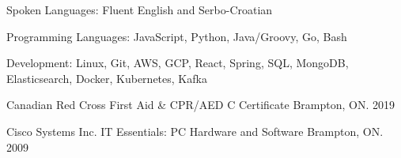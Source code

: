 
\begin{cvhonors}

  \cvhonor
    {Spoken Languages:} %
    {Fluent English and Serbo-Croatian} %
    {} %
    {} %

  \cvhonor
    {Programming Languages:} %
    {JavaScript, Python, Java/Groovy, Go, Bash} %
    {} %
    {} %

  \cvhonor
    {Development:} %
    {Linux, Git, AWS, GCP, React, Spring, SQL, MongoDB, Elasticsearch, Docker, Kubernetes, Kafka} %
    {} %
    {} %



  \cvhonor
    {Canadian Red Cross} %
    {First Aid \& CPR/AED C Certificate} %
    {Brampton, ON.} %
    {2019} %


  \cvhonor
    {Cisco Systems Inc.} %
    {IT Essentials: PC Hardware and Software} %
    {Brampton, ON.} %
    {2009} %

\end{cvhonors}